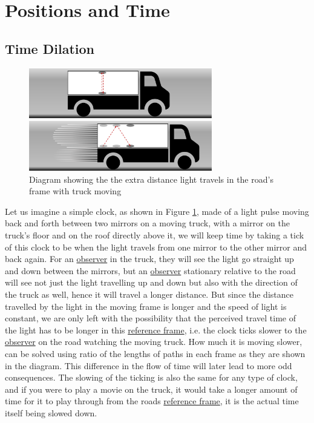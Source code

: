 \section{Positions and Time}
\subsection{Time Dilation}

\begin{figure}[H]
	\centering
	\includegraphics[width=8cm]{images/pdf/lorry_clock.pdf}
	\caption{Diagram showing the the extra distance light travels in the road's frame with truck moving}
	\label{fig: truck clock}
\end{figure}

Let us imagine a simple clock, as shown in Figure \ref{fig: truck clock}, made of a light pulse moving back and forth between two mirrors on a moving truck, with a mirror on the truck’s floor and on the roof directly above it, we will keep time by taking a tick of this clock to be when the light travels from one mirror to the other mirror and back again. For an \hyperlink{def-observer}{observer} in the truck, they will see the light go straight up and down between the mirrors, but an \hyperlink{def-observer}{observer} stationary relative to the road will see not just the light travelling up and down but also with the direction of the truck as well, hence it will travel a longer distance. But since the distance travelled by the light in the moving frame is longer and the speed of light is constant, we are only left with the possibility that the perceived travel time of the light has to be longer in this \hyperlink{def-Reference-frame}{reference frame}, i.e. the clock ticks slower to the \hyperlink{def-observer}{observer} on the road watching the moving truck. How much it is moving slower, can be solved using ratio of the lengths of paths in each frame as they are shown in the diagram. This difference in the flow of time will later lead to more odd consequences. The slowing of the ticking is also the same for any type of clock, and if you were to play a movie on the truck, it would take a longer amount of time for it to play through from the roads \hyperlink{def-Reference-frame}{reference frame}, it is the actual time itself being slowed down.

